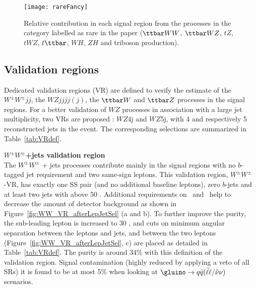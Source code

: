 \begin{figure}[htb!]
\centering
\texttt{[image: rareFancy]}
\caption{Relative contribution in each signal region from the processes in the category labelled as rare in the paper ($\ttbar WW$, 
$\ttbar WZ$, $tZ$, $tWZ$, $t\ttbar$, $WH$, $ZH$ and triboson production). }
\label{fig:RareBreakdown} 
\end{figure} 

\subsection{Validation regions}
\label{sec:bkg.irred.def}

Dedicated validation regions (VR) are defined to verify the estimate
of the $W^\pm W^\pm jj$, the $WZjjjj(j)$, the $\ttbar W$ and $\ttbar Z$ 
processes in the signal regions. 
For a better validation of $WZ$ processes in association with a large jet 
multiplicity, two VRs are proposed : $WZ$4j and $WZ$5j, with 4 and
respectively 5 reconstructed jets in the event.
The corresponding selections are summarized in Table~\ref{tab:VRdef}.

\par{\bf $W^\pm W^\pm$+jets validation region\\}
The $W^{\pm}W^{\pm}$ + jets processes contribute mainly in the signal regions with no $b$-tagged jet requirement and two same-sign leptons. This validation region, $W^\pm W^{\pm}$-VR, has exactly one SS pair (and no additional baseline leptons), zero $b$-jets and at least two jets with \pt above 50 \GeV. Additional requirements on \met\ and \meff\ help to decrease the amount of detector background as shown in Figure~\ref{fig:WW_VR_afterLepJetSel} (a and b). To further improve the purity, the sub-leading lepton \pt is increased to 30 \GeV, and cuts on minimum angular separation between the leptons and jets, and between the two leptons (Figure~\ref{fig:WW_VR_afterLepJetSel}, c) are placed as detailed in Table~\ref{tab:VRdef}. The purity is around 34\% with this definition 
of the validation region. Signal contamination (highly reduced by applying a veto of all SRs) it is found to be at most 5\% when looking at $\gluino \rightarrow q\bar q (\tilde \ell \ell / \tilde \nu \nu)$ scenarios.

